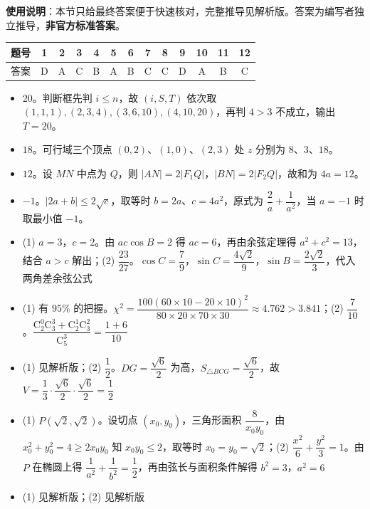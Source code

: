 
\begin{gknotice}
\textbf{使用说明}：本节只给最终答案便于快速核对，完整推导见解析版。答案为编写者独立推导，\textbf{非官方标准答案}。
\end{gknotice}

\begin{center}\begin{tabular}{ccccccccccccc}
\toprule
题号 & 1 & 2 & 3 & 4 & 5 & 6 & 7 & 8 & 9 & 10 & 11 & 12 \\
\midrule
答案 & D & A & C & B & A & B & C & C & D & A & B & C \\
\bottomrule
\end{tabular}\end{center}

\begin{itemize}[leftmargin=2.6em]
  \item[\textbf{13.}] $20$。判断框先判 $i\leqslant n$，故 $(i,S,T)$ 依次取 $(1,1,1),(2,3,4),(3,6,10),(4,10,20)$，再判 $4>3$ 不成立，输出 $T=20$。
  \item[\textbf{14.}] $18$。可行域三个顶点 $(0,2)$、$(1,0)$、$(2,3)$ 处 $z$ 分别为 $8$、$3$、$18$。
  \item[\textbf{15.}] $12$。设 $MN$ 中点为 $Q$，则 $|AN|=2|F_1Q|$，$|BN|=2|F_2Q|$，故和为 $4a=12$。
  \item[\textbf{16.}] $-1$。$|2a+b|\leqslant 2\sqrt c$，取等时 $b=2a$、$c=4a^2$，原式为 $\dfrac2a+\dfrac1{a^2}$，当 $a=-1$ 时取最小值 $-1$。
\end{itemize}

\begin{itemize}[leftmargin=2.6em]
  \item[\textbf{17.}] (1) $a=3$，$c=2$。由 $ac\cos B=2$ 得 $ac=6$，再由余弦定理得 $a^2+c^2=13$，结合 $a>c$ 解出；(2) $\dfrac{23}{27}$。$\cos C=\dfrac79$，$\sin C=\dfrac{4\sqrt2}9$，$\sin B=\dfrac{2\sqrt2}3$，代入两角差余弦公式
  \item[\textbf{18.}] (1) 有 $95\%$ 的把握。$\chi^2=\dfrac{100(60\times10-20\times10)^2}{80\times20\times70\times30}\approx4.762>3.841$；(2) $\dfrac7{10}$。$\dfrac{\mathrm C_2^0\mathrm C_3^3+\mathrm C_2^1\mathrm C_3^2}{\mathrm C_5^3}=\dfrac{1+6}{10}$
  \item[\textbf{19.}] (1) 见解析版；(2) $\dfrac12$。$DG=\dfrac{\sqrt6}2$ 为高，$S_{\triangle BCG}=\dfrac{\sqrt6}2$，故 $V=\dfrac13\cdot\dfrac{\sqrt6}2\cdot\dfrac{\sqrt6}2=\dfrac12$
  \item[\textbf{20.}] (1) $P(\sqrt2,\sqrt2)$。设切点 $(x_0,y_0)$，三角形面积 $\dfrac8{x_0y_0}$，由 $x_0^2+y_0^2=4\geqslant2x_0y_0$ 知 $x_0y_0\leqslant2$，取等时 $x_0=y_0=\sqrt2$；(2) $\dfrac{x^2}6+\dfrac{y^2}3=1$。由 $P$ 在椭圆上得 $\dfrac1{a^2}+\dfrac1{b^2}=\dfrac12$，再由弦长与面积条件解得 $b^2=3$，$a^2=6$
  \item[\textbf{21.}] (1) 见解析版；(2) 见解析版
\end{itemize}

